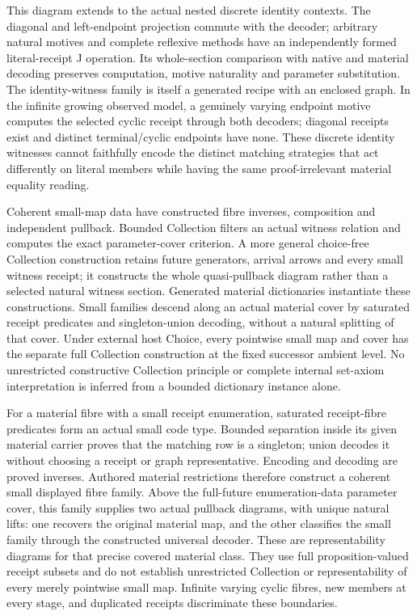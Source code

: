 \documentclass[11pt]{article}
\theoremstyle{definition}
\theoremstyle{remark}
\begin{document}
This diagram extends to the actual nested discrete identity contexts.
The diagonal and left-endpoint projection commute with the decoder;
arbitrary natural motives and complete reflexive methods have an
independently formed literal-receipt J operation. Its whole-section
comparison with native and material decoding preserves computation,
motive naturality and parameter substitution. The identity-witness
family is itself a generated recipe with an enclosed graph. In the
infinite growing observed model, a genuinely varying endpoint motive
computes the selected cyclic receipt through both decoders; diagonal
receipts exist and distinct terminal/cyclic endpoints have none. These
discrete identity witnesses cannot faithfully encode the distinct
matching strategies that act differently on literal members while
having the same proof-irrelevant material equality reading.

Coherent small-map data have constructed fibre inverses, composition and
independent pullback.  Bounded Collection filters an actual witness
relation and computes the exact parameter-cover criterion.  A more
general choice-free Collection construction retains future generators,
arrival arrows and every small witness receipt; it constructs the whole
quasi-pullback diagram rather than a selected natural witness section.
Generated material dictionaries instantiate these constructions.  Small
families descend along an actual material cover by saturated receipt
predicates and singleton-union decoding, without a natural splitting of
that cover.  Under external host Choice, every pointwise small map and
cover has the separate full Collection construction at the fixed successor
ambient level.  No unrestricted constructive Collection principle or
complete internal set-axiom interpretation is inferred from a bounded
dictionary instance alone.

For a material fibre with a small receipt enumeration, saturated
receipt-fibre predicates form an actual small code type.  Bounded
separation inside its given material carrier proves that the matching
row is a singleton; union decodes it without choosing a receipt or graph
representative.  Encoding and decoding are proved inverses.  Authored
material restrictions therefore construct a coherent small displayed
fibre family.  Above the full-future enumeration-data parameter cover,
this family supplies two actual pullback diagrams, with unique natural
lifts: one recovers the original material map, and the other classifies
the small family through the constructed universal decoder.  These
are representability diagrams for that precise covered material class.
They use full proposition-valued receipt subsets and do not establish
unrestricted Collection or representability of every merely pointwise
small map.  Infinite varying cyclic fibres, new members at every stage,
and duplicated receipts discriminate these boundaries.
\end{document}
